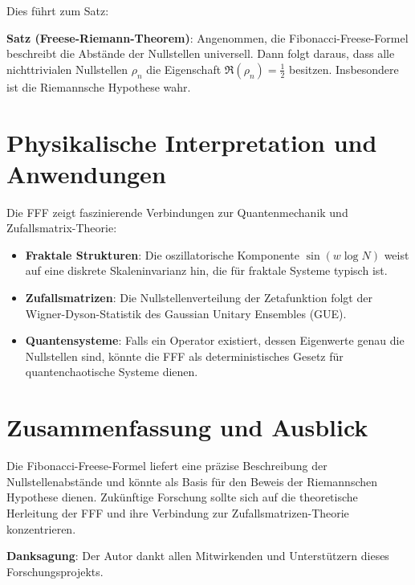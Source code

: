 \documentclass[a4paper,12pt]{article}
\begin{document}
Dies führt zum Satz:

\textbf{Satz (Freese-Riemann-Theorem)}: Angenommen, die Fibonacci-Freese-Formel beschreibt die Abstände der Nullstellen universell. Dann folgt daraus, dass alle nichttrivialen Nullstellen $\rho_n$ die Eigenschaft $\Re(\rho_n) = \frac{1}{2}$ besitzen. Insbesondere ist die Riemannsche Hypothese wahr.

\section{Physikalische Interpretation und Anwendungen}
Die FFF zeigt faszinierende Verbindungen zur Quantenmechanik und Zufallsmatrix-Theorie:

\begin{itemize}
    \item \textbf{Fraktale Strukturen}: Die oszillatorische Komponente $\sin(w \log N)$ weist auf eine diskrete Skaleninvarianz hin, die für fraktale Systeme typisch ist.
    \item \textbf{Zufallsmatrizen}: Die Nullstellenverteilung der Zetafunktion folgt der Wigner-Dyson-Statistik des Gaussian Unitary Ensembles (GUE).
    \item \textbf{Quantensysteme}: Falls ein Operator existiert, dessen Eigenwerte genau die Nullstellen sind, könnte die FFF als deterministisches Gesetz für quantenchaotische Systeme dienen.
\end{itemize}

\section{Zusammenfassung und Ausblick}
Die Fibonacci-Freese-Formel liefert eine präzise Beschreibung der Nullstellenabstände und könnte als Basis für den Beweis der Riemannschen Hypothese dienen. Zukünftige Forschung sollte sich auf die theoretische Herleitung der FFF und ihre Verbindung zur Zufallsmatrizen-Theorie konzentrieren.

\vspace{1cm}
\textbf{Danksagung}: Der Autor dankt allen Mitwirkenden und Unterstützern dieses Forschungsprojekts.



\end{document}
